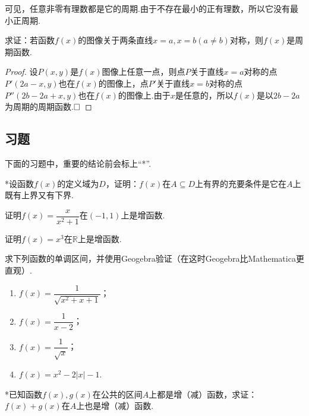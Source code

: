 \documentclass[lang=cn,math=cm,chinesefont=nofont,11pt,scheme=chinese,twocol]{elegantbook}
\begin{document}
可见，任意非零有理数都是它的周期.由于不存在最小的正有理数，所以它没有最小正周期.

\begin{example}
  求证：若函数$f(x)$的图像关于两条直线$x=a,x=b(a\neq b)$对称，则$f(x)$是周期函数.
\end{example}

\begin{proof}
  设$P(x,y)$是$f(x)$图像上任意一点，则点$P$关于直线$x=a$对称的点$P'(2a-x,y)$也在$f(x)$的图像上，点$P'$关于直线$x=b$对称的点$P''(2b-2a+x,y)$也在$f(x)$的图像上.由于$x$是任意的，所以$f(x)$是以$2b-2a$为周期的周期函数.$\hfill\square$
\end{proof}

\subsection{习题}

下面的习题中，重要的结论前会标上“*”.

\begin{exercise}
  *设函数$f(x)$的定义域为$D$，证明：$f(x)$在$A\subseteq D$上有界的充要条件是它在$A$上既有上界又有下界.
\end{exercise}

\begin{spacing}{1.8}
  \begin{exercise}
    证明$f(x)=\dfrac x{x^2+1}$在$(-1,1)$上是增函数.
  \end{exercise}
  
  \begin{exercise}
    证明$f(x)=x^3$在$\mathbb{R}$上是增函数.
  \end{exercise}
  
  \begin{exercise}
    求下列函数的单调区间，并使用Geogebra验证（在这时Geogebra比Mathematica更直观）.
  \end{exercise}
  
  \begin{enumerate}
    \item $f(x)=\dfrac{1}{\sqrt{x^{2}+x+1}}$；
    \item $f(x)=\dfrac{1}{x-2}$；
    \item $f(x)=\dfrac1{\sqrt{x}}$；
    \item $f(x)=x^{2}-2|x|-1$.
  \end{enumerate}
\end{spacing}

\begin{exercise}
  *已知函数$f(x),g(x)$在公共的区间$A$上都是增（减）函数，求证：$f(x)+g(x)$在$A$上也是增（减）函数.
\end{exercise}
\end{document}
